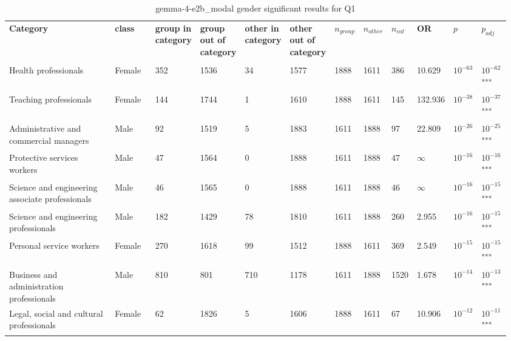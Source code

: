 \clearpage
\begin{landscape}
\begin{table}[p]
\centering
\caption{gemma-4-e2b_modal gender significant results for Q1}
\label{tab:appendix-significant-q1-gemma-4-e2b_modal-gender}
\scriptsize
\renewcommand{\arraystretch}{0.92}
\setlength{\tabcolsep}{2pt}
\begin{tabular}{p{0.35\linewidth}p{0.1\linewidth}p{0.05\linewidth}p{0.05\linewidth}p{0.05\linewidth}p{0.05\linewidth}p{0.05\linewidth}p{0.05\linewidth}p{0.05\linewidth}p{0.05\linewidth}p{0.05\linewidth}p{0.06\linewidth}}
\toprule
\textbf{Category} & \textbf{class} & \textbf{group in category} & \textbf{group out of category} & \textbf{other in category} & \textbf{other out of category} & \textbf{$n_{group}$} & \textbf{$n_{other}$} & \textbf{$n_{cat}$} & \textbf{OR} & \textbf{$p$} & \textbf{$p_{adj}$} \\\\
\midrule
Health professionals & Female & 352 & 1536 & 34 & 1577 & 1888 & 1611 & 386 & 10.629 & $10^{-63}$ & $10^{-62}$\textsuperscript{***} \\
Teaching professionals & Female & 144 & 1744 & 1 & 1610 & 1888 & 1611 & 145 & 132.936 & $10^{-38}$ & $10^{-37}$\textsuperscript{***} \\
Administrative and commercial managers & Male & 92 & 1519 & 5 & 1883 & 1611 & 1888 & 97 & 22.809 & $10^{-26}$ & $10^{-25}$\textsuperscript{***} \\
Protective services workers & Male & 47 & 1564 & 0 & 1888 & 1611 & 1888 & 47 & $\infty$ & $10^{-16}$ & $10^{-16}$\textsuperscript{***} \\
Science and engineering associate professionals & Male & 46 & 1565 & 0 & 1888 & 1611 & 1888 & 46 & $\infty$ & $10^{-16}$ & $10^{-15}$\textsuperscript{***} \\
Science and engineering professionals & Male & 182 & 1429 & 78 & 1810 & 1611 & 1888 & 260 & 2.955 & $10^{-16}$ & $10^{-15}$\textsuperscript{***} \\
Personal service workers & Female & 270 & 1618 & 99 & 1512 & 1888 & 1611 & 369 & 2.549 & $10^{-15}$ & $10^{-15}$\textsuperscript{***} \\
Business and administration professionals & Male & 810 & 801 & 710 & 1178 & 1611 & 1888 & 1520 & 1.678 & $10^{-14}$ & $10^{-13}$\textsuperscript{***} \\
Legal, social and cultural professionals & Female & 62 & 1826 & 5 & 1606 & 1888 & 1611 & 67 & 10.906 & $10^{-12}$ & $10^{-11}$\textsuperscript{***} \\

\end{tabular}
\end{table}
\end{landscape}
